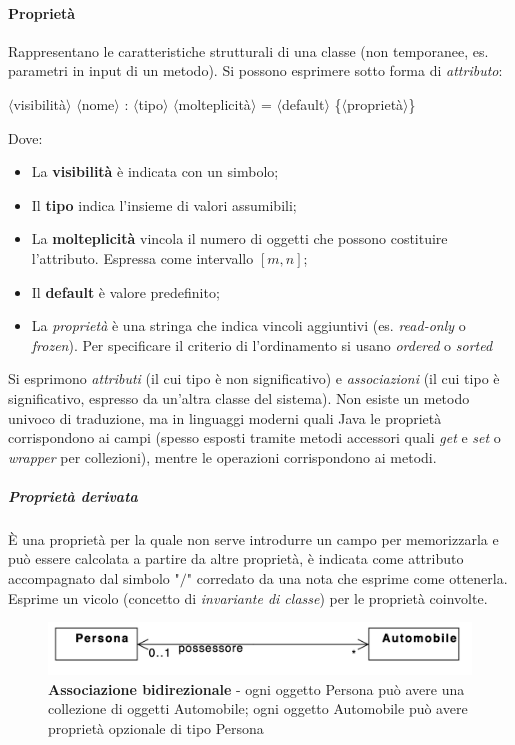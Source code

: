 \paragraph{Proprietà} Rappresentano le caratteristiche strutturali di una classe (non temporanee, es. parametri in input di un metodo). Si possono esprimere sotto forma di \textit{attributo}:
\begin{center}
    $\langle$visibilità$\rangle$ $\langle$nome$\rangle$ : $\langle$tipo$\rangle$ $\langle$molteplicità$\rangle$ = $\langle$default$\rangle$ \{$\langle$proprietà$\rangle$\}
\end{center}
Dove:
\begin{itemize}
    \item La \textbf{visibilità} è indicata con un simbolo;
    \item Il \textbf{tipo} indica l'insieme di valori assumibili;
    \item La \textbf{molteplicità} vincola il numero di oggetti che possono costituire l'attributo. Espressa come intervallo $[m, n]$;
    \item Il \textbf{default} è valore predefinito;
    \item La \textit{proprietà} è una stringa che indica vincoli aggiuntivi (es. \textit{read-only} o \textit{frozen}). Per specificare il criterio di l'ordinamento si usano \textit{ordered} o \textit{sorted}
\end{itemize}
Si esprimono \textit{attributi} (il cui tipo è non significativo) e \textit{associazioni} (il cui tipo è significativo, espresso da un'altra classe del sistema).
Non esiste un metodo univoco di traduzione, ma in linguaggi moderni quali Java le proprietà corrispondono ai campi (spesso esposti tramite metodi accessori quali \textit{get} e \textit{set} o \textit{wrapper} per collezioni), mentre le operazioni corrispondono ai metodi.

\subparagraph{Proprietà derivata} È una proprietà per la quale non serve introdurre un campo per memorizzarla e può essere calcolata a partire da altre proprietà, è indicata come attributo accompagnato dal simbolo "$/$" corredato da una nota che esprime come ottenerla. Esprime un vicolo (concetto di \textit{invariante di classe}) per le proprietà coinvolte.

\begin{figure}[H]
    \centering
    \includegraphics[width=0.75\linewidth]{assets/UML/class/class-3.png}
    \caption{\textbf{Associazione bidirezionale} - ogni oggetto Persona può avere una collezione di oggetti Automobile; ogni oggetto Automobile può avere proprietà opzionale di tipo Persona}
\end{figure}

